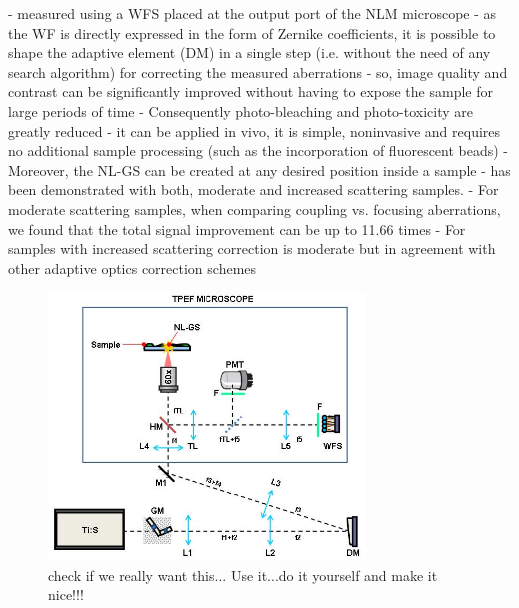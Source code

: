 - measured using a WFS placed at the output port of the NLM microscope
- as the WF is directly expressed in the form of Zernike coefficients, it is possible to shape the adaptive element (DM) in a single step (i.e. without the need of any search algorithm) for correcting the measured aberrations
- so, image quality and contrast can be significantly improved without having to expose the sample for large periods of time
- Consequently photo-bleaching and photo-toxicity are greatly reduced
- it can be applied in vivo, it is simple, noninvasive and requires no additional sample processing (such as the incorporation of fluorescent beads)
- Moreover, the NL-GS can be created at any desired position inside a sample
- has been demonstrated with both, moderate and increased scattering samples.
- For moderate scattering samples, when comparing coupling vs. focusing aberrations, we found that the total signal improvement can be up to 11.66 times 
- For samples with increased scattering correction is moderate but in agreement with other adaptive optics correction schemes

\begin{figure}
	\centering
		\includegraphics[width=0.75\textwidth]{images/TPFM_guide-star.jpg}
	\caption{check if we really want this...\cite{scan_TPFM_guide_start} Use it...do it yourself and make it nice!!!}
	\label{fig:TPFM_guide-star}
\end{figure}

\cite{scan_TPFM_guide_start}




